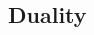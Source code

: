\documentclass[12pt,oneside]{book} %
\begin{document}
\begin{spacing}{1}





\part{Duality}




% 

% 

% 

% 




\end{spacing}
\end{document}

